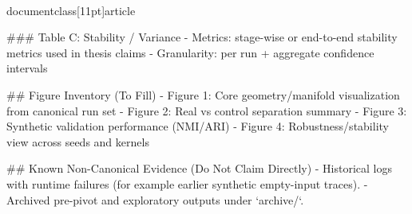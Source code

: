\\documentclass[11pt]{article}
\begin{document}
\begin{CodeBlock}
### Table C: Stability / Variance
- Metrics: stage-wise or end-to-end stability metrics used in thesis claims
- Granularity: per run + aggregate confidence intervals

## Figure Inventory (To Fill)
- Figure 1: Core geometry/manifold visualization from canonical run set
- Figure 2: Real vs control separation summary
- Figure 3: Synthetic validation performance (NMI/ARI)
- Figure 4: Robustness/stability view across seeds and kernels

## Known Non-Canonical Evidence (Do Not Claim Directly)
- Historical logs with runtime failures (for example earlier synthetic empty-input traces).
- Archived pre-pivot and exploratory outputs under `archive/`.

\end{CodeBlock}
\end{document}

